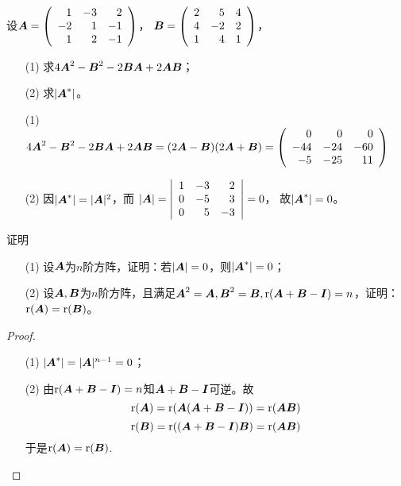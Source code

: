\begin{frame}

\begin{li}[2006-2007第二学期]
设$\MA=\left(
\begin{array}{rrr}
1&-3&2\\
-2&1&-1\\
1&2&-1
\end{array}
\right)$， $\MB=\left(
\begin{array}{rrr}
2&5&4\\
4&-2&2\\
1&4&1
\end{array}
\right)$，
\begin{itemize}
\item[(1)] 求$4\MA^2-\MB^2-2\MB\MA+2\MA\MB$；
\item[(2)]  求$|\MA^*|$。
\end{itemize}
\end{li}
\pause

\begin{jie}
\begin{itemize}
\item[(1)] $4\MA^2-\MB^2-2\MB\MA+2\MA\MB=(2\MA-\MB)(2\MA+\MB)=\left(
\begin{array}{rrr}
0&0&0\\
-44&-24&-60\\
-5&-25&11
\end{array}
\right)$ \pause 
\item[(2)]  因$|\MA^*|=|\MA|^{2}$，而
$
|\MA|=\left|
\begin{array}{rrr}
1&-3&2\\
0&-5&3\\
0&5&-3
\end{array}
\right|=0
$，
故$|\MA^*|=0$。
\end{itemize}
\end{jie}
\end{frame}

\begin{frame}

\begin{li}[2007-2008第一学期]
证明
\begin{itemize}
\item[(1)] 设$\MA$为$n$阶方阵，证明：若$|\MA|=0$，则$|\MA^*|=0$；
\item[(2)]  设$\MA,\MB$为$n$阶方阵，且满足$\MA^2=\MA,\MB^2=\MB,\rank(\MA+\MB-\MI)=n$，证明：$\rank(\MA)=\rank(\MB)$。
\end{itemize}
\end{li}
\pause

\begin{proof}
\begin{itemize}
\item[(1)] $|\MA^*|=|\MA|^{n-1}=0$；\pause 
\item[(2)]  由$\rank(\MA+\MB-\MI)=n$知$\MA+\MB-\MI$可逆。故
$$
\rank(\MA)=\rank(\MA(\MA+\MB-\MI))=\rank(\MA\MB)
$$
$$
\rank(\MB)=\rank((\MA+\MB-\MI)\MB)=\rank(\MA\MB)
$$
于是$\rank(\MA)=\rank(\MB)$.
\end{itemize}
\end{proof}
\end{frame}


